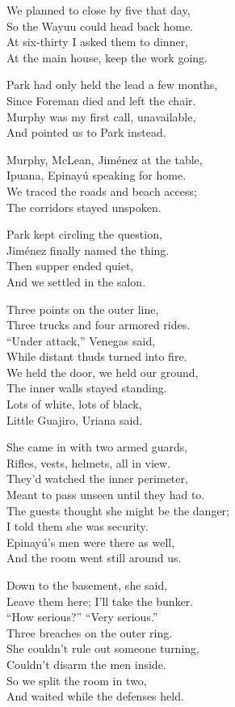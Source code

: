 \begin{lyrics}
We planned to close by five that day,\\
So the Wayuu could head back home.\\
At six-thirty I asked them to dinner,\\
At the main house, keep the work going.

Park had only held the lead a few months,\\
Since Foreman died and left the chair.\\
Murphy was my first call, unavailable,\\
And pointed us to Park instead.

Murphy, McLean, Jiménez at the table,\\
Ipuana, Epinayú speaking for home.\\
We traced the roads and beach access;\\
The corridors stayed unspoken.

Park kept circling the question,\\
Jiménez finally named the thing.\\
Then supper ended quiet,\\
And we settled in the salon.

Three points on the outer line,\\
Three trucks and four armored rides.\\
“Under attack,” Venegas said,\\
While distant thuds turned into fire.\\
We held the door, we held our ground,\\
The inner walls stayed standing.\\
Lots of white, lots of black,\\
Little Guajiro, Uriana said.

She came in with two armed guards,\\
Rifles, vests, helmets, all in view.\\
They’d watched the inner perimeter,\\
Meant to pass unseen until they had to.\\
The guests thought she might be the danger;\\
I told them she was security.\\
Epinayú’s men were there as well,\\
And the room went still around us.

Down to the basement, she said,\\
Leave them here; I’ll take the bunker.\\
“How serious?” “Very serious.”\\
Three breaches on the outer ring.\\
She couldn’t rule out someone turning,\\
Couldn’t disarm the men inside.\\
So we split the room in two,\\
And waited while the defenses held.


\end{lyrics}
